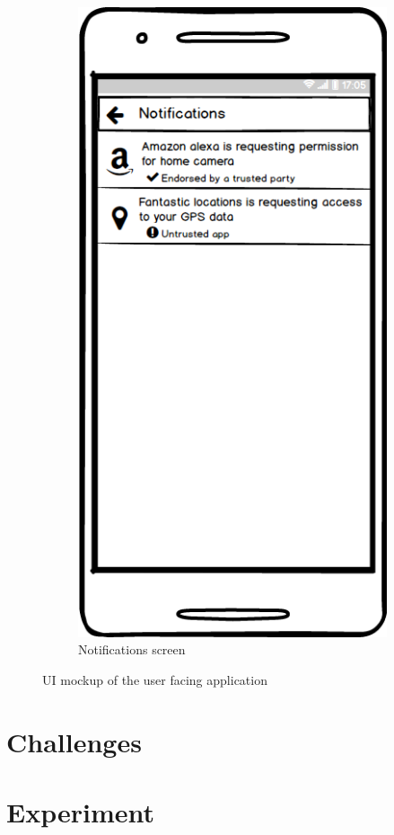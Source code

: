 \documentclass[conference]{IEEEtran}
\begin{document}
\begin{figure}[t]
\begin{subfigure}{0.24\textwidth}
	\includegraphics[width=0.95\linewidth]{screen4.png}
	\caption{Notifications screen}
	\label{fig:screen4}
	\end{subfigure}
\caption{UI mockup of the user facing application}\label{fig:screens}
\end{figure}

\section{Challenges}


\section{Experiment}


\begin{thebibliography}{00}

\end{thebibliography}
\end{document}
